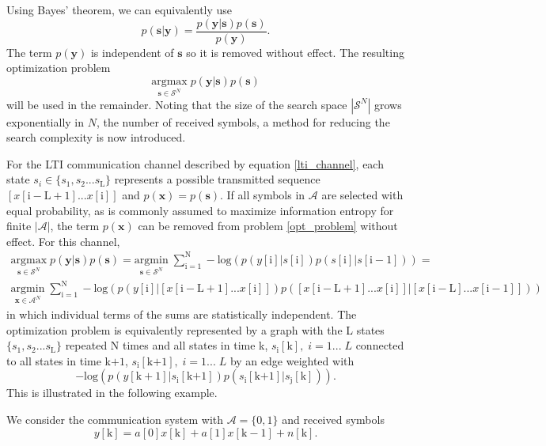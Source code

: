 Using Bayes' theorem, we can equivalently use 
\begin{equation*}
p(\mathbf{s}|\mathbf{y}) = 
\frac
{p(\mathbf{y}|\mathbf{s})p(\mathbf{s})}
{p(\mathbf{y})}.
\end{equation*}
The term $p(\mathbf{y})$ is independent of $\mathbf{s}$ so it is removed without effect. The resulting optimization problem
\begin{equation}\label{opt_problem}
\underset{\mathbf{s}\in\mathcal{S}^N}{\text{argmax}}\; p(\mathbf{y}|\mathbf{s})p(\mathbf{s})
\end{equation}
will be used in the remainder.
Noting that the size of the search space $|\mathcal{S}^N|$ grows exponentially in $N$, the number of received symbols, a method for reducing the search complexity is now introduced. 
\par
For the LTI communication channel described by equation \eqref{lti_channel}, each state $s_i \in \{s_1, s_2... s_{\text{L}}\}$ represents a possible transmitted sequence $[x[\mathrm{i-L+1}]...x[\mathrm{i}]]$  and $p(\mathbf{x})=p(\mathbf{s})$. If all symbols in $\mathcal{A}$ are selected with equal probability, as is commonly assumed to maximize information entropy for finite $|\mathcal{A}|$, the term $p(\mathbf{x})$ can be removed from problem \ref{opt_problem} without effect. 
For this channel,
\begin{gather*}
\underset{\mathbf{s}\in\mathcal{S}^N}{\text{argmax}} \; p(\mathbf{y}|\mathbf{s})p(\mathbf{s})=
\underset{\mathbf{s}\in\mathcal{S}^N}{\text{argmin}} \; \sum_{\mathrm{i=1}}^{\mathrm{N}} -\text{log}(p(y[\mathrm{i}]|s[\mathrm{i}]) p(s[\mathrm{i}]|s[\mathrm{i-1}]))=\\
\underset{\mathbf{x}\in\mathcal{A}^N}{\text{argmin}} \; \sum_{\mathrm{i=1}}^{\mathrm{N}} -\text{log}(p(y[\mathrm{i}]|\left[x[\mathrm{i-L+1}]...x[\mathrm{i}]\right]) p(\left[x[\mathrm{i-L+1}]...x[\mathrm{i}]\right]|\left[x[\mathrm{i-L}]...x[\mathrm{i-1}]\right]))
\end{gather*}
in which individual terms of the sums are statistically independent. The optimization problem is equivalently
  represented by a graph with the L states $\{s_1, s_2... s_{\text{L}}\}$ repeated N times and all states in time k, $s_{\text{i}}[\text{k}], \; i = 1... \;L$ connected to all states in time k$+1$, $s_{\text{i}}[\text{k+1}], \; i = 1... \;L$ 
   by an edge weighted with
\begin{equation*}
-\text{log}(p(y[\text{k}+1]|s_{\text{i}}[\text{k+1}])p(s_{\text{i}}[\text{k+1}]|s_{\text{j}}[\text{k}])).
\end{equation*}   
This is illustrated in the following example. 
   \par
   We consider the communication system with $\mathcal{A}=\{0, 1\}$ and received symbols 
   \begin{equation*}
y[\text{k}] =  a[\text{0}]x[\text{k}] + a[\text{1}]x[\text{k}-1] + n[\text{k}].
\end{equation*}

